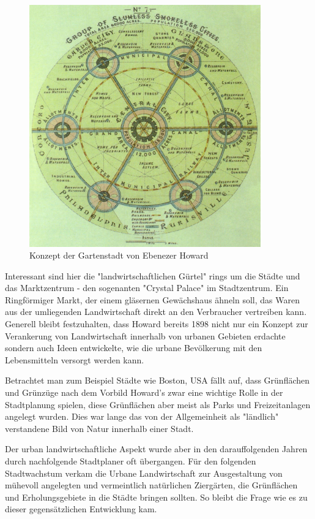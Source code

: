 \documentclass{article}
\begin{document}
\begin{figure}[htp]
\centering
\includegraphics[width=10cm]{image_folder/GardenCityConcept_EbenezerHoward.jpg}
\caption{Konzept der Gartenstadt von Ebenezer Howard}
\label{fig:GardenCityConcept_EbenezerHoward}
\end{figure}

Interessant sind hier die "landwirtschaftlichen Gürtel" rings um die Städte und das Marktzentrum - den sogenanten "Crystal Palace" im Stadtzentrum.
Ein Ringförmiger Markt, der einem gläsernen Gewächshaus ähneln soll, das Waren aus der umliegenden Landwirtschaft direkt an den Verbraucher vertreiben kann. Generell bleibt festzuhalten, dass Howard bereits 1898 nicht nur ein Konzept zur Verankerung von Landwirtschaft innerhalb von urbanen Gebieten erdachte sondern auch Ideen entwickelte, wie die urbane Bevölkerung mit den Lebensmitteln versorgt werden kann.

Betrachtet man zum Beispiel Städte wie Boston, USA fällt auf, dass Grünflächen und Grünzüge nach dem Vorbild Howard's zwar eine wichtige Rolle in der Stadtplanung spielen, diese Grünflächen aber meist als Parks und Freizeitanlagen angelegt wurden. Dies war lange das von der Allgemeinheit als "ländlich" verstandene Bild von Natur innerhalb einer Stadt.

Der urban landwirtschaftliche Aspekt wurde aber in den darauffolgenden Jahren durch nachfolgende Stadtplaner oft übergangen. Für den folgenden Stadtwachstum verkam die Urbane Landwirtschaft zur Ausgestaltung von mühevoll angelegten und vermeintlich natürlichen Ziergärten, die Grünflächen und Erholungsgebiete in die Städte bringen sollten. So bleibt die Frage wie es zu dieser gegensätzlichen Entwicklung kam.
\end{document}
